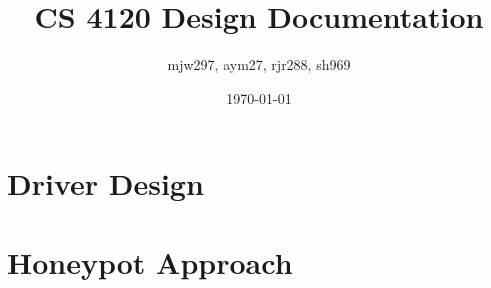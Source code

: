 \documentclass[11pt]{article}
\title{CS 4120 Design Documentation}
\author{mjw297, aym27, rjr288, sh969}
\date{\today}
\begin{document}
\maketitle

\section{Driver Design}

\section{Honeypot Approach}
\end{document}
